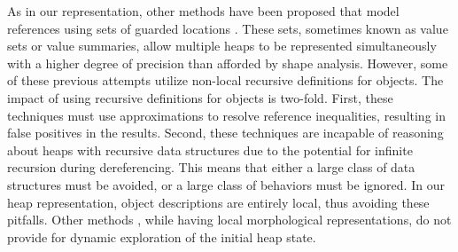 




As in our representation, other methods have been proposed that model
references using sets of guarded locations
\cite{Xie:2005,Cherem:2007,Dillig:2011,Sen:2014}. These sets,
sometimes known as value sets or value summaries, allow multiple heaps
to be represented simultaneously with a higher degree of precision
than afforded by shape analysis. However, some of these previous
attempts \cite{Xie:2005,Cherem:2007} utilize non-local recursive
definitions for objects. The impact of using recursive definitions for
objects is two-fold. First, these techniques must use approximations
to resolve reference inequalities, resulting in false positives in the
results. Second, these techniques are incapable of reasoning about
heaps with recursive data structures due to the potential for infinite
recursion during dereferencing. This means that either a large class
of data structures must be avoided, or a large class of behaviors must
be ignored. In our heap representation, object descriptions are
entirely local, thus avoiding these pitfalls. Other methods
\cite{Dillig:2011,Sen:2014}, while having local morphological
representations, do not provide for dynamic exploration of the initial
heap state.

